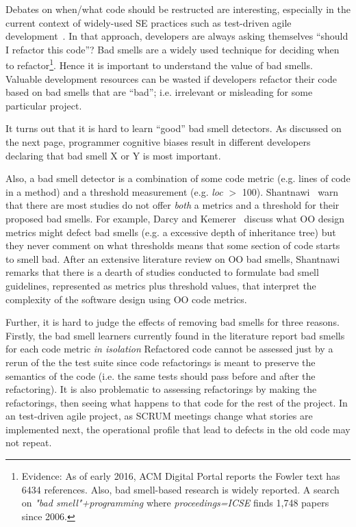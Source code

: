 \documentclass{sig-alternate}
\begin{document}
Debates on when/what code should be restructed are interesting, especially
in the current context of  widely-used SE practices such as
test-driven agile development~\cite{beck2003test,janzen05,williams2003test,george2003initial}.
In that approach, developers are always asking themselves ``should I refactor this code''?
Bad smells are a widely used  technique for deciding when to refactor\footnote{Evidence: As of  early 2016, ACM Digital Portal reports 
the Fowler text has 6434 references. Also, bad smell-based research
is widely reported. A search  on {\em "bad smell"+programming} 
where {\em proceedings=ICSE} finds 1,748 papers since 2006.}.
Hence it is important to understand the value of
 bad smells.  
Valuable development resources can be wasted if developers
refactor their code based on   bad smells that are ``bad''; i.e. 
 irrelevant or misleading
for some particular project.
 

It turns out that it is hard to learn ``good'' bad smell detectors.
As discussed on the next page, programmer
   cognitive biases result in different
developers declaring that
bad smell X or Y is most important. 

Also, a bad smell  detector
is a combination of some code metric (e.g. lines of code in a method)
and a threshold measurement (e.g. {\em loc} $>$ 100). 
Shantnawi~\cite{Shatnawi10} warn that  there are most  studies do not offer
{\em both} a metrics and a threshold for their proposed bad smells. For example,  Darcy and Kemerer~\cite{darcy05}
discuss what OO design metrics might defect bad smells (e.g. a excessive
depth of inheritance tree) but they never comment on what thresholds
means that some section of code starts to smell bad. After
an extensive literature review on OO bad smells, Shantnawi remarks that there is a dearth
of  studies  conducted to formulate bad smell guidelines,
represented as metrics plus threshold values, that interpret the complexity of the software design using OO code metrics. 

 
Further, it is hard to judge the  effects of removing bad smells
for three reasons.
Firstly, the bad smell learners currently found in the literature
report bad smells for each code metric {\em in isolation}
Refactored code cannot be assessed just by a rerun of the the test
suite since
code refactorings is meant to
preserve the semantics of the code (i.e. the same tests
should pass before and after the refactoring). 
It is also problematic to assessing refactorings by making the
refactorings,  then seeing what happens to that code for the rest
of the project. In an test-driven agile project, as
SCRUM meetings change what stories are implemented next,
the operational profile that lead to defects in the old
code may not repeat.
\end{document}
